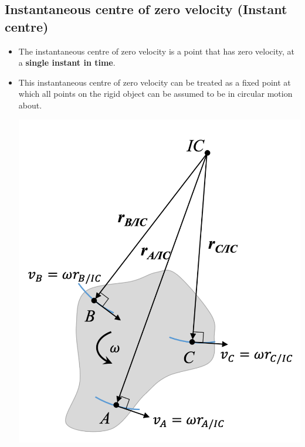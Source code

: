 \documentclass[11pt]{article}
\begin{document}
\subsection{Instantaneous centre of zero velocity (Instant centre)}
\label{sec:org7a67f36}
\begin{itemize}
\item The instantaneous centre of zero velocity is a point that has zero velocity, at a \textbf{single instant in time}.
\item This instantaneous centre of zero velocity can be treated as a fixed point at which all points on the rigid object can be assumed to be in circular motion about.
\begin{center}
\includegraphics[width=.9\linewidth]{./images/instantaneous-centre-as-centre-of-rotation.png}
\end{center}
\end{itemize}

 \newpage
\end{document}
